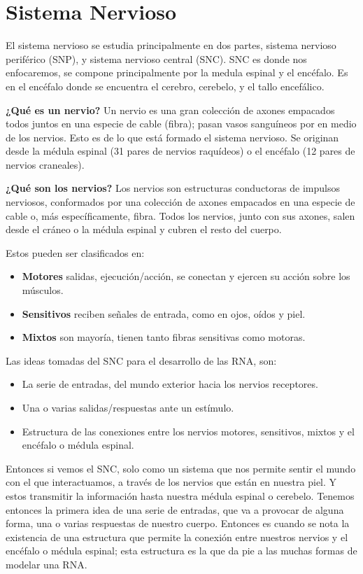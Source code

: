 \section{Sistema Nervioso}

El sistema nervioso se estudia principalmente en dos partes, sistema nervioso periférico (SNP), y sistema nervioso central (SNC). SNC es donde nos enfocaremos, se compone principalmente por la medula espinal y el encéfalo. Es en el encéfalo donde se encuentra el cerebro, cerebelo, y el tallo encefálico.\cite{sistemaNervioso}   

\textbf{¿Qué es un nervio?}
Un nervio es una gran colección de axones empacados todos juntos en una especie de cable (fibra); pasan vasos sanguíneos por en medio de los nervios. Esto es de lo que está formado el sistema nervioso. Se originan desde la médula espinal (31 pares de nervios raquídeos) o el encéfalo (12 pares de nervios craneales).

\textbf{¿Qué son los nervios?}
Los nervios son estructuras conductoras de impulsos nerviosos, conformados por una colección de axones empacados en una especie de cable o, más específicamente, fibra. Todos los nervios, junto con sus axones, salen desde el cráneo o la médula espinal y cubren el resto del cuerpo.\cite{neurona_A_cerebro}


Estos pueden ser clasificados en:

\begin{itemize}
\item \textbf{Motores} salidas, ejecución/acción, se conectan y ejercen su acción sobre los músculos.
\item \textbf{Sensitivos} reciben señales de entrada, como en ojos, oídos y piel.
\item \textbf{Mixtos} son mayoría, tienen tanto fibras sensitivas como motoras.
\end{itemize}

Las ideas tomadas del SNC para el desarrollo de las RNA, son:
\begin{itemize}
 \item La serie de entradas, del mundo exterior hacia los nervios receptores.
 \item Una o varias salidas/respuestas ante un estímulo.
 \item Estructura de las conexiones entre los nervios motores, sensitivos, mixtos y el encéfalo o médula espinal. 
\end{itemize}

Entonces si vemos el SNC, solo como un sistema que nos permite sentir el mundo con el que interactuamos, a través de los nervios que están en nuestra piel. Y estos transmitir la información hasta nuestra médula espinal o cerebelo. Tenemos entonces la primera idea de una serie de entradas, que va a provocar de alguna forma, una o varias respuestas de nuestro cuerpo. Entonces es cuando se nota la existencia de una estructura que permite la conexión entre nuestros nervios y el encéfalo o médula espinal; esta estructura es la que da pie a las muchas formas de modelar una RNA.

